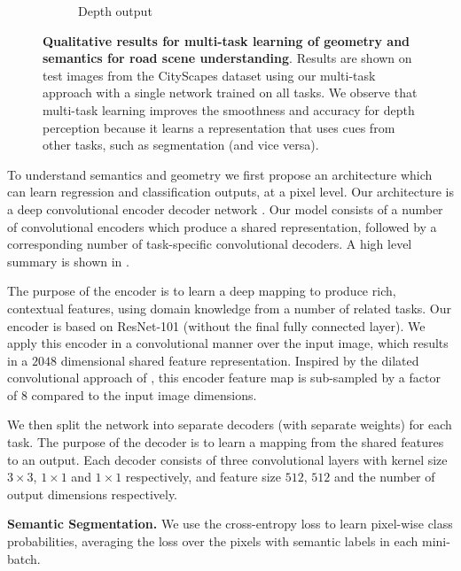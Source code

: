 \begin{figure}[t]
{\begin{subfigure}[t]{0.24\linewidth}
\begin{center}
  \caption{Depth output}
\end{center}
\end{subfigure}}
	\caption[Qualitative results on the CityScapes dataset.]{\textbf{Qualitative results for multi-task learning of geometry and semantics for road scene understanding}. Results are shown on test images from the CityScapes dataset using our multi-task approach with a single network trained on all tasks. We observe that multi-task learning improves the smoothness and accuracy for depth perception because it learns a representation that uses cues from other tasks, such as segmentation (and vice versa).}
	\label{fig:cityscapesqual}
\end{figure}

To understand semantics and geometry we first propose an architecture which can learn regression and classification outputs, at a pixel level. Our architecture is a deep convolutional encoder decoder network \citep{badrinarayanan2017segnet}. Our model consists of a number of convolutional encoders which produce a shared representation, followed by a corresponding number of task-specific convolutional decoders. A high level summary is shown in .

The purpose of the encoder is to learn a deep mapping to produce rich, contextual features, using domain knowledge from a number of related tasks. Our encoder is based on ResNet-101 \citep{he2016deep} (without the final fully connected layer). We apply this encoder in a convolutional manner over the input image, which results in a $2048$ dimensional shared feature representation. Inspired by the dilated convolutional approach of \citep{chen2016deeplab}, this encoder feature map is sub-sampled by a factor of 8 compared to the input image dimensions.

We then split the network into separate decoders (with separate weights) for each task. The purpose of the decoder is to learn a mapping from the shared features to an output. Each decoder consists of three convolutional layers with kernel size $3\times3$, $1\times1$ and $1\times1$ respectively, and feature size $512$, $512$ and the number of output dimensions respectively.

\textbf{Semantic Segmentation.}
We use the cross-entropy loss to learn pixel-wise class probabilities, averaging the loss over the pixels with semantic labels in each mini-batch.

